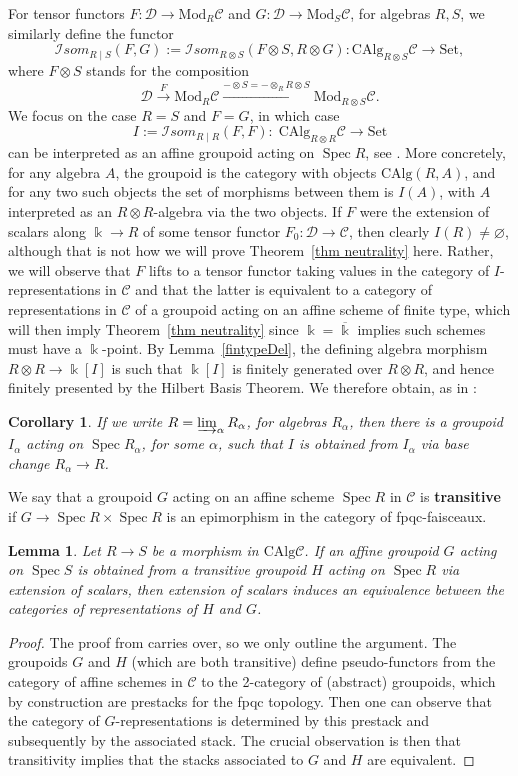 \documentclass[11pt]{amsart}
\def\Ds{\mathscr{D}}
\def\cC{\mathscr{C}}
\def\bk{\Bbbk}
\def\Spec{\operatorname{Spec}}
\def\Set{\text{Set}}
\def\Mod{\mathrm{Mod}}
\newtheorem{cor}[thm]{Corollary}
\newtheorem{lemma}[thm]{Lemma}
\theoremstyle{definition}
\theoremstyle{remark}
\numberwithin{equation}{section}
\newcommand{\Isom}{\mathcal{I}som}
\newcommand{\CAlg}{\mathrm{CAlg}}
\begin{document}
For tensor functors $F:\Ds\to\Mod_R\cC$ and $G:\Ds\to\Mod_S\cC$, for algebras $R,S$, we similarly define the functor
$$\Isom_{R\mid S}(F,G):=\Isom_{R\otimes S}(F\otimes S,R\otimes G):\CAlg_{R\otimes S}\cC\to \Set,$$
where $F\otimes S$ stands for the composition
\[\Ds\xrightarrow{F}\Mod_R\cC\xrightarrow{-\otimes S=-\otimes_RR\otimes S} \Mod_{R\otimes S}\cC.\]
We focus on the case $R=S$ and $F=G$, in which case \[I:=\Isom_{R\mid R}(F,F):\;\CAlg_{R\otimes R}\cC\to\Set\] can be interpreted as an affine groupoid acting on $\Spec R$, see \cite[3.10]{Del02}. More concretely, for any algebra $A$, the groupoid is the category with objects $\CAlg(R,A)$, and for any two such objects the set of morphisms between them is $I(A)$, with $A$ interpreted as an $R\otimes R$-algebra via the two objects. If $F$ were the extension of scalars along $\bk\to R$ of some tensor functor $F_0:\Ds\to\cC$, then clearly $I(R)\not=\varnothing$, although that is not how we will prove Theorem~\ref{thm neutrality} here. Rather, we will observe that $F$ lifts to a tensor functor taking values in the category of $I$-representations in $\cC$ and that the latter is equivalent to a category of representations in $\cC$ of a groupoid acting on an affine scheme of finite type, which will then imply Theorem~\ref{thm neutrality} since $\bk=\overline{\bk}$ implies such schemes must have a $\bk$-point. By Lemma~\ref{fintypeDel}, the defining algebra morphism $R\otimes R\to \bk[I]$ is such that $\bk[I]$ is finitely generated over $R\otimes R$, and hence finitely presented by the Hilbert Basis Theorem. We therefore obtain, as in \cite[Corollaire~4.3]{Del02}:
\begin{cor}\label{Corlim}
    If we write $R=\varinjlim_\alpha R_\alpha$, for algebras $R_\alpha$, then there is a groupoid $I_\alpha$ acting on $\Spec R_\alpha$, for some $\alpha$, such that $I$ is obtained from $I_\alpha$ via base change $R_\alpha\to R$.
\end{cor}

We say that a groupoid $G$ acting on an affine scheme $\Spec R$ in $\cC$ is {\bf transitive} if $G \to \Spec R \times \Spec R$ is an epimorphism in the category of fpqc-faisceaux.

\begin{lemma}\label{L44}\cite[Lemme~4.4]{Del02} Let $R\to S$ be a morphism in $\CAlg\cC$. If an affine groupoid $G$ acting on $\Spec S$ is obtained from a transitive groupoid $H$ acting on $\Spec R$ via extension of scalars, then extension of scalars induces an equivalence between the categories of representations of $H$ and $G$.
\end{lemma}
\begin{proof}
    The proof from \cite[\S 3]{Del90} carries over, so we only outline the argument. The groupoids $G$ and $H$ (which are both transitive) define pseudo-functors from the category of affine schemes in $\cC$ to the 2-category of (abstract) groupoids, which by construction are prestacks for the fpqc topology. Then one can observe that the category of $G$-representations is determined by this prestack and subsequently by the associated stack. The crucial observation is then that transitivity implies that the stacks associated to $G$ and $H$ are equivalent.
\end{proof}
\end{document}
